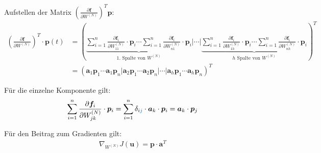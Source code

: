 \documentclass[a4paper, 12pt]{scrartcl}
\newcommand{\blau}[2][blau]{\textcolor{#1}{#2}}
\begin{document}
Aufstellen der Matrix $\left(\frac{\partial \bm{f}}{\partial W^{(N)}}\right)^T \bm{p}$:
\begin{align*}
    \left(\frac{\partial \bm{f}}{\partial W^{(N)}}\right)^T \cdot \bm{p}(t)
    &=
    \left(
        \underbrace{
            \sum_{i=1}^{n} \frac{\partial \bm{f}_i}{\partial W^{(N)}_{11}} \cdot \bm{p}_i 
            \cdots
            \sum_{i=1}^{n} \frac{\partial \bm{f}_i}{\partial W^{(N)}_{n1}} \cdot \bm{p}_i
        }_{
            1.\text{ Spalte von } W^{(N)}
        }
        \bigg|
        \cdots
        \bigg|
        \underbrace{
            \sum_{i=1}^{n} \frac{\partial \bm{f}_i}{\partial W^{(N)}_{1h}} \cdot \bm{p}_i 
            \cdots
            \sum_{i=1}^{n} \frac{\partial \bm{f}_i}{\partial W^{(N)}_{nh}} \cdot \bm{p}_i 
        }_{
            h \text{ Spalte von } W^{(N)}
        }
    \right)^T
    \\
    &=
    \left(
        \bm{a}_1 \bm{p}_1 
        \cdots
        \bm{a}_1 \bm{p}_n
        \bigg|
        \bm{a}_2 \bm{p}_1 
        \cdots
        \bm{a}_2 \bm{p}_n
        \bigg|
        \cdots
        \bigg|
        \bm{a}_h \bm{p}_1
        \cdots
        \bm{a}_h \bm{p}_n
    \right)^T
\end{align*}

Für die einzelne Komponente gilt:
\begin{align*}
    \sum_{i=1}^{n} 
    \frac{\partial \bm{f}_i}{\partial W^{(N)}_{jk}}
    \cdot \bm{p}_i
    =
    \sum_{i=1}^{n} 
    \delta_{i\blau{j}}
    \cdot 
    \bm{a}_k \cdot \bm{p}_i
    =
    \bm{a}_k \cdot \bm{p}_j
\end{align*}

Für den Beitrag zum Gradienten gilt:
\begin{align*}
    \nabla_{W^{(N)}} J(\bm{u})
    =
    \bm{p} \cdot \bm{a}^T
\end{align*}
\end{document}
